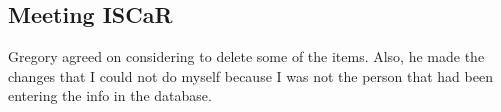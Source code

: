 \subsection{Meeting ISCaR}
\label{task:20180213_cj1}

Gregory agreed on considering to delete some of the items.
Also, he made the changes that I could not do myself because I was not the person that had been entering the info in the database.
